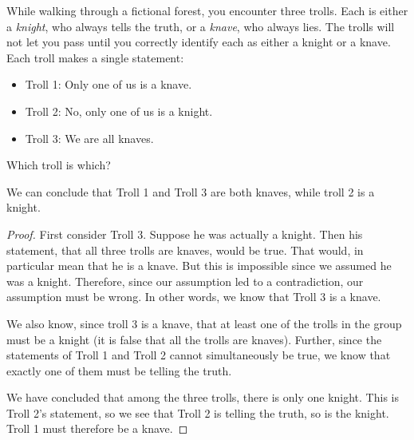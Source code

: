 \documentclass[11pt]{exam}
\begin{document}
\begin{questions}
  \question While walking through a fictional forest, you encounter three trolls.  Each is either a {\em knight}, who always tells the truth, or a {\em knave}, who always lies.  The trolls will not let you pass until you correctly identify each as either a knight or a knave.  Each troll makes a single statement:
  \begin{itemize}
   \item[] Troll 1: Only one of us is a knave.
   \item[] Troll 2: No, only one of us is a knight.
   \item[] Troll 3: We are all knaves.
  \end{itemize}
  Which troll is which?
  
  \begin{solution}
    We can conclude that Troll 1 and Troll 3 are both knaves, while troll 2 is a knight.
    
    \begin{proof}
      First consider Troll 3. Suppose he was actually a knight.  Then his statement, that all three trolls are knaves, would be true.  That would, in particular mean that he is a knave.  But this is impossible since we assumed he was a knight.  Therefore, since our assumption led to a contradiction, our assumption must be wrong.  In other words, we know that Troll 3 is a knave.
      
      We also know, since troll 3 is a knave, that at least one of the trolls in the group must be a knight (it is false that all the trolls are knaves).  Further, since the statements of Troll 1 and Troll 2 cannot simultaneously be true, we know that exactly one of them must be telling the truth.
      
      We have concluded that among the three trolls, there is only one knight.  This is Troll 2's statement, so we see that Troll 2 is telling the truth, so is the knight.  Troll 1 must therefore be a knave.
    \end{proof}

  \end{solution}

\end{questions}
\end{document}
